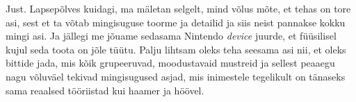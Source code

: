
Just. Lapsepõlves kuidagi, ma mäletan selgelt, mind võlus mõte, et tehas on 
tore asi, sest et ta võtab mingisuguse toorme ja detailid ja siis neist 
pannakse kokku mingi asi. Ja jällegi me jõuame sedasama  Nintendo \emph{device} 
juurde, et füüsilisel kujul seda toota on jõle tüütu. Palju lihtsam oleks teha 
seesama asi nii, et oleks bittide jada, mis kõik grupeeruvad, moodustavaid 
mustreid ja sellest peaaegu nagu võluväel tekivad mingisugused asjad, mis 
inimestele tegelikult on tänaseks sama reaalsed tööriistad kui haamer ja höövel.
